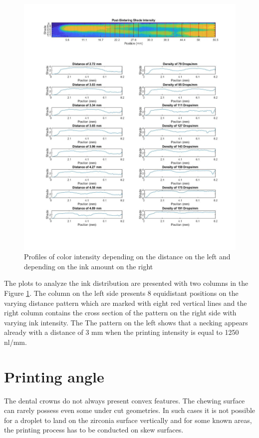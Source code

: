\bigskip

\begin{figure}[H]
	\centering
	\includegraphics[width=1\textwidth]{grafiken/vProfile.jpg}
	\caption{Profiles of color intensity depending on the distance on the left and depending on the ink amount on the right}
	\label{fig:vProfile}
\end{figure} 

\bigskip

The plots to analyze the ink distribution are presented with two columns in the Figure \ref{fig:vProfile}. The column on the left side presents  8  equidistant positions on the varying distance pattern which are marked with eight red vertical lines and the right column contains the cross section of the pattern on the right side with varying ink intensity. The The pattern on the left shows that a necking appears already with a distance of 3 mm when the printing intensity is equal to 1250 nl/mm. 




\section{Printing angle}
The dental crowns do not always present convex features. The chewing surface can rarely possess even some under cut geometries. In such cases it is not possible for a droplet to land on the zirconia surface vertically and for some known areas, the printing process has to be conducted on skew surfaces. 

